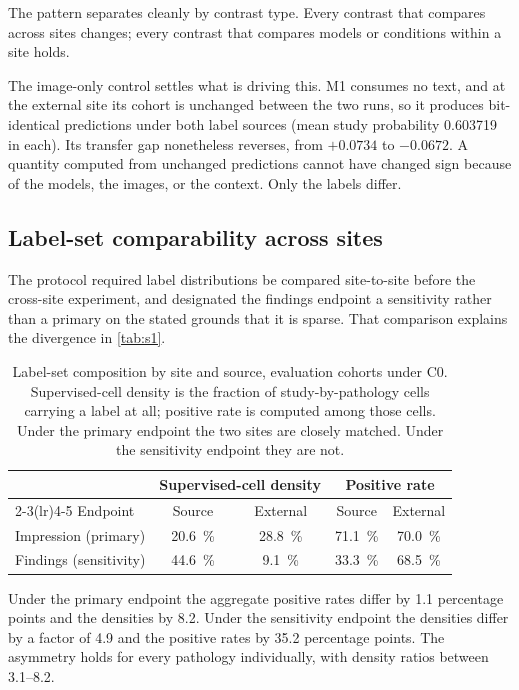 The pattern separates cleanly by contrast type. Every contrast that compares
across sites changes; every contrast that compares models or conditions within a
site holds.

The image-only control settles what is driving this. M1 consumes no text, and at
the external site its cohort is unchanged between the two runs, so it produces
bit-identical predictions under both label sources (mean study probability
\num{0.603719} in each). Its transfer gap nonetheless reverses, from $+0.0734$
to $-0.0672$. A quantity computed from unchanged predictions cannot have changed
sign because of the models, the images, or the context. Only the labels differ.

\subsection{Label-set comparability across sites}
\label{sec:comparability}

The protocol required label distributions be compared site-to-site before the
cross-site experiment, and designated the findings endpoint a sensitivity rather
than a primary on the stated grounds that it is sparse. That comparison explains
the divergence in \cref{tab:s1}.

\begin{table}[htbp]
\centering
\caption{Label-set composition by site and source, evaluation cohorts under C0.
Supervised-cell density is the fraction of study-by-pathology cells carrying a
label at all; positive rate is computed among those cells. Under the primary
endpoint the two sites are closely matched. Under the sensitivity endpoint they
are not.}
\label{tab:comparability}
\begin{tabular}{lcccc}
\toprule
& \multicolumn{2}{c}{Supervised-cell density} & \multicolumn{2}{c}{Positive rate} \\
\cmidrule(lr){2-3}\cmidrule(lr){4-5}
Endpoint & Source & External & Source & External \\
\midrule
Impression (primary)   & \SI{20.6}{\percent} & \SI{28.8}{\percent}
                       & \SI{71.1}{\percent} & \SI{70.0}{\percent} \\
Findings (sensitivity) & \SI{44.6}{\percent} & \SI{9.1}{\percent}
                       & \SI{33.3}{\percent} & \SI{68.5}{\percent} \\
\bottomrule
\end{tabular}
\end{table}

Under the primary endpoint the aggregate positive rates differ by
\num{1.1} percentage points and the densities by \num{8.2}. Under the
sensitivity endpoint the densities differ by a factor of \num{4.9} and the
positive rates by \num{35.2} percentage points. The asymmetry holds for every
pathology individually, with density ratios between \numrange{3.1}{8.2}.

